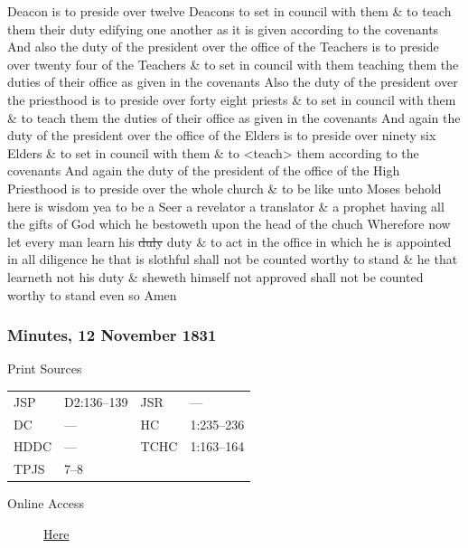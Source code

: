 {Deacon is to preside over twelve Deacons to set in council with them \& to teach them their duty edifying one another as it is given according to the covenants And also the duty of the president over the office of the Teachers is to preside over twenty four of the Teachers \& to set in council with them teaching them the duties of their office as given in the covenants Also the duty of the president over the priesthood is to preside over forty eight priests \& to set in council with them \& to teach them the duties of their office as given in the covenants And again the duty of the president over the office of the Elders is to preside over ninety six Elders \& to set in council with them \& to <teach> them according to the covenants And again the duty of the president of the office of the High Priesthood is to preside over the whole church \& to be like unto Moses behold here is wisdom yea to be a Seer a revelator a translator \& a prophet having all the gifts of God which he bestoweth upon the head of the chuch Wherefore now let every man learn his \sout{duly} duty \& to act in the office in which he is appointed in all diligence he that is slothful shall not be counted worthy to stand \& he that learneth not his duty \& sheweth himself not approved shall not be counted worthy to stand even so Amen
				
		\subsubsection{Minutes, 12 November 1831}
			\label{EMS-1831-JS-12-NOV-1831-MIN}
		
			\begin{description}
				\item[Print Sources]
			\end{description}

				\begin{tabular}{p{0.5in}p{1in}p{0.5in}p{1in}}
				JSP	 	& D2:136--139	& JSR 		& --- \\
				DC	 	& ---		 	& HC 		& 1:235--236 \\
				HDDC 	& ---			& TCHC 		& 1:163--164 \\
				TPJS	& 7--8			& 			&  \\
				\end{tabular}
			
			\begin{description}
				\item[Online Access] \href{https://www.josephsmithpapers.org/paper-summary/minutes-12-november-1831/1}{Here}
			\end{description}
			
}

